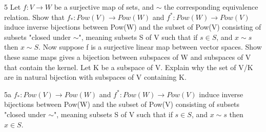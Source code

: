 \documentclass{article}
\newcommand{\rarr}[0]{\rightarrow}
\begin{document}
\begin{PROB}{5}\label{Problem 5.}
    Let $f: V \rarr W$ be a surjective map of sets, and $\sim$ the corresponding equivalence relation. Show that $f_*: Pow(V) \rarr Pow(W)$  and $f^*: Pow(W) \rarr Pow(V)$ induce inverse bijections between Pow(W) and the subset of Pow(V) consisting of subsets "closed under $\sim$", meaning subsets S of V such that if $s \in S$, and $x \sim s$ then $x \sim S$.  Now suppose f is a surjective linear map between vector spaces. Show these same maps gives a bijection between subspaces of W and subspaces of V that contain the kernel. Let K be a subspace of V. Explain why the set of V/K are in natural bijection with subspaces of V containing K. 
\end{PROB}
\begin{claim}{5a}
    $f_*: Pow(V) \rarr Pow(W)$  and $f^*: Pow(W) \rarr Pow(V)$ induce inverse bijections between Pow(W) and the subset of Pow(V) consisting of subsets "closed under $\sim$", meaning subsets S of V such that if $s \in S$, and $x \sim s$ then $x \in S$.
\end{claim}
\end{document}
